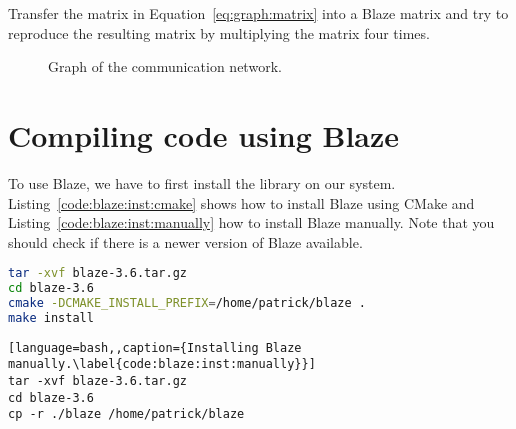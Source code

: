 \begin{exercise}
Transfer the matrix in Equation~\ref{eq:graph:matrix} into a Blaze matrix and try to reproduce the resulting matrix by multiplying the matrix four times.
\end{exercise}

\begin{figure}[tb]
\centering
{}
\caption{Graph of the communication network.}
\label{fig:matrix:application:graph}
\end{figure}

\section{Compiling code using Blaze}
To use Blaze, we have to first install the library on our system. Listing~\ref{code:blaze:inst:cmake} shows how to install Blaze using CMake and Listing~\ref{code:blaze:inst:manually} how to install Blaze manually. Note that you should check if there is a newer version of Blaze available.

\begin{minipage}{\linewidth}
\begin{minipage}{0.45\linewidth}
\begin{lstlisting}[language=bash,caption={Installing Blaze using CMake.\label{code:blaze:inst:cmake}}]
tar -xvf blaze-3.6.tar.gz
cd blaze-3.6
cmake -DCMAKE_INSTALL_PREFIX=/home/patrick/blaze .
make install
\end{lstlisting}
\end{minipage}
\hfill
\begin{minipage}{0.45\linewidth}
\begin{lstlisting}[language=bash,,caption={Installing Blaze manually.\label{code:blaze:inst:manually}}]
tar -xvf blaze-3.6.tar.gz
cd blaze-3.6
cp -r ./blaze /home/patrick/blaze
\end{lstlisting}
\end{minipage}
\end{minipage}

